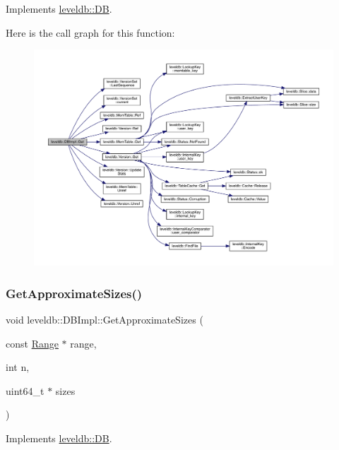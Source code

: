 Implements \mbox{\hyperlink{classleveldb_1_1_d_b_ad43bd7937b9af88ff856eb8158890911}{leveldb\+::\+DB}}.

Here is the call graph for this function\+:
\nopagebreak
\begin{figure}[H]
\begin{center}
\leavevmode
\includegraphics[width=350pt]{classleveldb_1_1_d_b_impl_a089964ddcd1f5dc85e73499ae57be508_cgraph}
\end{center}
\end{figure}
\mbox{\label{classleveldb_1_1_d_b_impl_af08e218d92064699942c195ce0f06010}} 
\subsubsection{\texorpdfstring{GetApproximateSizes()}{GetApproximateSizes()}}
{\footnotesize\ttfamily void leveldb\+::\+D\+B\+Impl\+::\+Get\+Approximate\+Sizes (\begin{DoxyParamCaption}\item[{const \mbox{\hyperlink{structleveldb_1_1_range}{Range}} $\ast$}]{range,  }\item[{int}]{n,  }\item[{uint64\+\_\+t $\ast$}]{sizes }\end{DoxyParamCaption})\hspace{0.3cm}{\ttfamily [virtual]}}



Implements \mbox{\hyperlink{classleveldb_1_1_d_b_ad4d54aa1dbcecc8583b013ab2d67aeff}{leveldb\+::\+DB}}.

